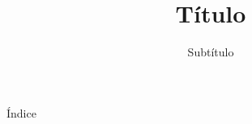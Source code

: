 \documentclass[spanish]{beamer}
\begin{document}
 	
	\title{Título}

	\subtitle{Subtítulo}


	\begin{frame}{Índice}


	\tableofcontents{}

	\end{frame}
\end{document}
